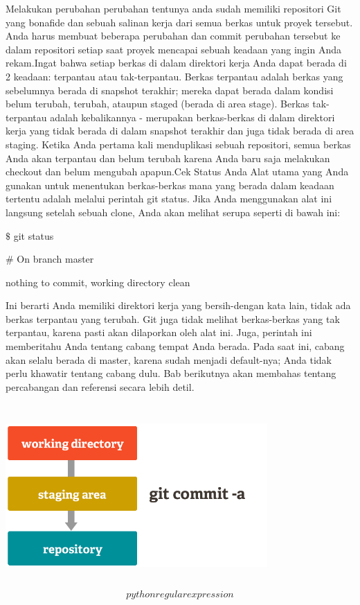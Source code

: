 Melakukan perubahan perubahan tentunya anda sudah memiliki repositori Git yang bonafide dan sebuah salinan kerja dari semua berkas untuk proyek tersebut. Anda harus membuat beberapa perubahan dan commit perubahan tersebut ke dalam repositori setiap saat proyek mencapai sebuah keadaan yang ingin Anda rekam.Ingat bahwa setiap berkas di dalam direktori kerja Anda dapat berada di 2 keadaan: terpantau atau tak-terpantau. Berkas terpantau adalah berkas yang sebelumnya berada di snapshot terakhir; mereka dapat berada dalam kondisi belum terubah, terubah, ataupun staged (berada di area stage). Berkas tak-terpantau adalah kebalikannya - merupakan berkas-berkas di dalam direktori kerja yang tidak berada di dalam snapshot terakhir dan juga tidak berada di area staging. Ketika Anda pertama kali menduplikasi sebuah repositori, semua berkas Anda akan terpantau dan belum terubah karena Anda baru saja melakukan checkout dan belum mengubah apapun.Cek Status Anda Alat utama yang Anda gunakan untuk menentukan berkas-berkas mana yang berada dalam keadaan tertentu adalah melalui perintah git status. Jika Anda menggunakan alat ini langsung setelah sebuah clone, Anda akan melihat serupa seperti di bawah ini: \par
\noindent 
 $  \$  $ git status \par
\noindent 
 $  \#  $ On branch master \par
\noindent 
nothing to commit, working directory clean \par
\noindent 
Ini berarti Anda memiliki direktori kerja yang bersih-dengan kata lain, tidak ada berkas terpantau yang terubah. Git juga tidak melihat berkas-berkas yang tak terpantau, karena pasti akan dilaporkan oleh alat ini. Juga, perintah ini memberitahu Anda tentang cabang tempat Anda berada. Pada saat ini, cabang akan selalu berada di master, karena sudah menjadi default-nya; Anda tidak perlu khawatir tentang cabang dulu. Bab berikutnya akan membahas tentang percabangan dan referensi secara lebih detil. \par
\noindent 


\includegraphics[width=10cm,height=7cm]{Figures/dapigit2.jpg}
\begin{equation}python regular expression\end{equation}





